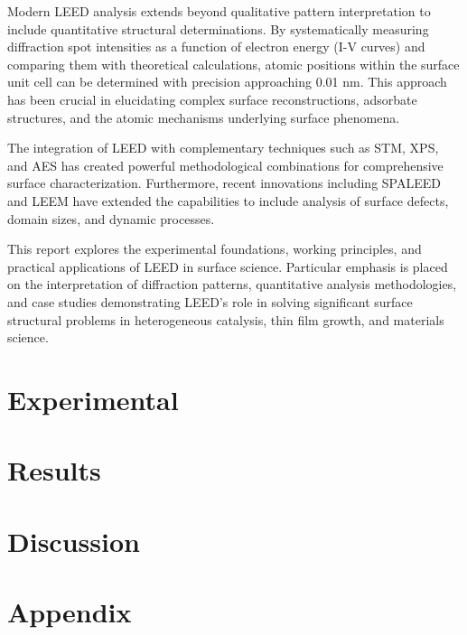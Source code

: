 \documentclass[fontsize=11pt,reqno,a4paper,oneside]{scrartcl}
\begin{document}
Modern \ac{LEED} analysis extends beyond qualitative pattern interpretation to include quantitative structural determinations. By systematically measuring diffraction spot intensities as a function of electron energy (I-V curves) and comparing them with theoretical calculations, atomic positions within the surface unit cell can be determined with precision approaching 0.01 nm. This approach has been crucial in elucidating complex surface reconstructions, adsorbate structures, and the atomic mechanisms underlying surface phenomena\supercite{Heinz1995}.

The integration of \ac{LEED} with complementary techniques such as \ac{STM}, \ac{XPS}, and \ac{AES} has created powerful methodological combinations for comprehensive surface characterization\supercite{Fadley2010}. Furthermore, recent innovations including \ac{SPALEED} and \ac{LEEM} have extended the capabilities to include analysis of surface defects, domain sizes, and dynamic processes\supercite{Henzler1991}.

This report explores the experimental foundations, working principles, and practical applications of \ac{LEED} in surface science. Particular emphasis is placed on the interpretation of diffraction patterns, quantitative analysis methodologies, and case studies demonstrating \ac{LEED}'s role in solving significant surface structural problems in heterogeneous catalysis, thin film growth, and materials science.

\clearpage
\section{Experimental}

\clearpage
\section{Results}

\clearpage
\section{Discussion}

\clearpage
\section{Appendix}
\printbibliography[heading=bibintoc, title={References}] 

\begin{acronym}
\end{acronym}
\end{document}

